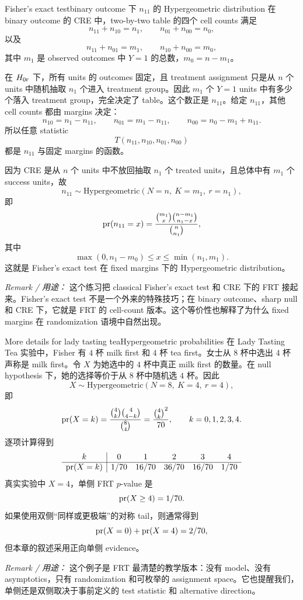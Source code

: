 \begin{exercisesolution}{Fisher's exact test}{binary outcome 下 $n_{11}$ 的 Hypergeometric distribution}
在 binary outcome 的 CRE 中，two-by-two table 的四个 cell counts 满足
\[
n_{11}+n_{10}=n_1,\qquad n_{01}+n_{00}=n_0,
\]
以及
\[
n_{11}+n_{01}=m_1,\qquad n_{10}+n_{00}=m_0,
\]
其中 $m_1$ 是 observed outcomes 中 $Y=1$ 的总数，$m_0=n-m_1$。

在 $H_{0\textsc{f}}$ 下，所有 units 的 outcomes 固定，且 treatment assignment 只是从 $n$ 个 units 中随机抽取 $n_1$ 个进入 treatment group。因此 $m_1$ 个 $Y=1$ units 中有多少个落入 treatment group，完全决定了 table。这个数正是 $n_{11}$。给定 $n_{11}$，其他 cell counts 都由 margins 决定：
\[
n_{10}=n_1-n_{11},\qquad
n_{01}=m_1-n_{11},\qquad
n_{00}=n_0-m_1+n_{11}.
\]
所以任意 statistic
\[
T(n_{11},n_{10},n_{01},n_{00})
\]
都是 $n_{11}$ 与固定 margins 的函数。

因为 CRE 是从 $n$ 个 units 中不放回抽取 $n_1$ 个 treated units，且总体中有 $m_1$ 个 success units，故
\[
n_{11}\sim \text{Hypergeometric}(N=n,\ K=m_1,\ r=n_1),
\]
即
\[
\textup{pr}(n_{11}=x)
=
\frac{\binom{m_1}{x}\binom{n-m_1}{n_1-x}}{\binom{n}{n_1}},
\]
其中
\[
\max(0,n_1-m_0)\leq x\leq \min(n_1,m_1).
\]
这就是 Fisher's exact test 在 fixed margins 下的 Hypergeometric distribution。

\emph{Remark / 用途：} 这个练习把 classical Fisher's exact test 和 CRE 下的 FRT 接起来。Fisher's exact test 不是一个外来的特殊技巧；在 binary outcome、sharp null 和 CRE 下，它就是 FRT 的 cell-count 版本。这个等价性也解释了为什么 fixed margins 在 randomization 语境中自然出现。
\end{exercisesolution}

\begin{exercisesolution}{More details for lady tasting tea}{Hypergeometric probabilities}
在 Lady Tasting Tea 实验中，Fisher 有 $4$ 杯 milk first 和 $4$ 杯 tea first。女士从 $8$ 杯中选出 $4$ 杯声称是 milk first。令 $X$ 为她选中的 $4$ 杯中真正 milk first 的数量。在 null hypothesis 下，她的选择等价于从 $8$ 杯中随机选 $4$ 杯。因此
\[
X\sim \text{Hypergeometric}(N=8,\ K=4,\ r=4),
\]
即
\[
\textup{pr}(X=k)=\frac{\binom{4}{k}\binom{4}{4-k}}{\binom{8}{4}}
=\frac{\binom{4}{k}^2}{70},\qquad k=0,1,2,3,4.
\]
逐项计算得到
\[
\begin{array}{c|ccccc}
k&0&1&2&3&4\\ \hline
\textup{pr}(X=k)&1/70&16/70&36/70&16/70&1/70
\end{array}
\]
真实实验中 $X=4$，单侧 FRT $p$-value 是
\[
\textup{pr}(X\geq 4)=1/70.
\]
如果使用双侧“同样或更极端”的对称 tail，则通常得到
\[
\textup{pr}(X=0)+\textup{pr}(X=4)=2/70,
\]
但本章的叙述采用正向单侧 evidence。

\emph{Remark / 用途：} 这个例子是 FRT 最清楚的教学版本：没有 model、没有 asymptotics，只有 randomization 和可枚举的 assignment space。它也提醒我们，单侧还是双侧取决于事前定义的 test statistic 和 alternative direction。
\end{exercisesolution}

